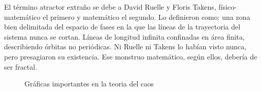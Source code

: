 El término atractor extraño se debe a David Ruelle y Floris Takens, físico-matemático el primero y matemático el segundo. Lo definieron como: una zona bien delimitada del espacio de fases en la que las líneas de la trayectoria del sistema nunca se cortan. Líneas de longitud infinita confinadas en área finita, describiendo órbitas no periódicas. Ni Ruelle ni Takens lo habían visto nunca, pero presagiaron su existencia. Ese monstruo matemático, según ellos, debería de ser fractal.

\begin{figure}[H]
	\centering
		\quad
	\caption{Gráficas importantes en la teoria del caos}
\end{figure}

